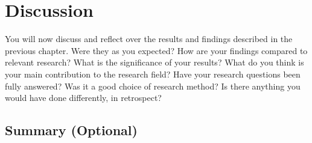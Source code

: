 \cleardoublepage
\chapter{Discussion}
\label{chap:discussion} 

You will now discuss and reflect over the results and findings described in the previous chapter. Were they as you expected? How are your findings compared to relevant research? What is the significance of your results? What do you think is your main contribution to the research field? Have your research questions been fully answered? Was it a good choice of research method? Is there anything you would have done differently, in retrospect?

\section{Summary (Optional)}

\lipsum[62-73]





